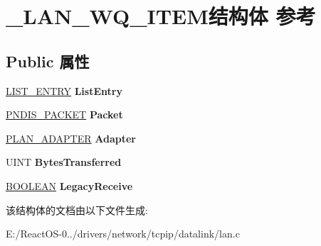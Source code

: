 \hypertarget{struct___l_a_n___w_q___i_t_e_m}{}\section{\+\_\+\+L\+A\+N\+\_\+\+W\+Q\+\_\+\+I\+T\+E\+M结构体 参考}
\label{struct___l_a_n___w_q___i_t_e_m}
\subsection*{Public 属性}
\begin{DoxyCompactItemize}
\item 
\mbox{\label{struct___l_a_n___w_q___i_t_e_m_a8485743ab37763481710b3980da6b810}} 
\hyperlink{struct___l_i_s_t___e_n_t_r_y}{L\+I\+S\+T\+\_\+\+E\+N\+T\+RY} {\bfseries List\+Entry}
\item 
\mbox{\label{struct___l_a_n___w_q___i_t_e_m_a6c03c08f7738f9d7bff7649b16b24888}} 
\hyperlink{struct___n_d_i_s___p_a_c_k_e_t}{P\+N\+D\+I\+S\+\_\+\+P\+A\+C\+K\+ET} {\bfseries Packet}
\item 
\mbox{\label{struct___l_a_n___w_q___i_t_e_m_a3f0ac7a5139363faf1143191040c54d3}} 
\hyperlink{struct_l_a_n___a_d_a_p_t_e_r}{P\+L\+A\+N\+\_\+\+A\+D\+A\+P\+T\+ER} {\bfseries Adapter}
\item 
\mbox{\label{struct___l_a_n___w_q___i_t_e_m_af64bdf8d90a189a205feb2e815a822c3}} 
U\+I\+NT {\bfseries Bytes\+Transferred}
\item 
\mbox{\label{struct___l_a_n___w_q___i_t_e_m_a9f4ed1163804cc9ab1e58822dbf82649}} 
\hyperlink{_processor_bind_8h_a112e3146cb38b6ee95e64d85842e380a}{B\+O\+O\+L\+E\+AN} {\bfseries Legacy\+Receive}
\end{DoxyCompactItemize}


该结构体的文档由以下文件生成\+:\begin{DoxyCompactItemize}
\item 
E\+:/\+React\+O\+S-\/0../drivers/network/tcpip/datalink/lan.\+c\end{DoxyCompactItemize}

